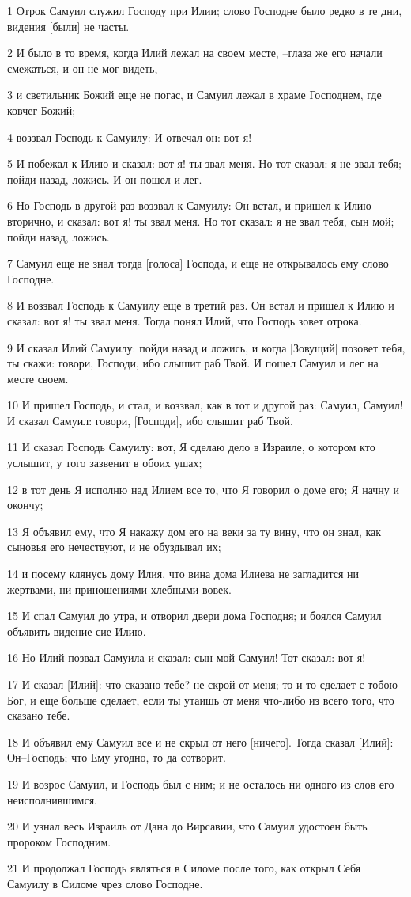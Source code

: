 \par 1 Отрок Самуил служил Господу при Илии; слово Господне было редко в те дни, видения [были] не часты.
\par 2 И было в то время, когда Илий лежал на своем месте, --глаза же его начали смежаться, и он не мог видеть, --
\par 3 и светильник Божий еще не погас, и Самуил лежал в храме Господнем, где ковчег Божий;
\par 4 воззвал Господь к Самуилу: И отвечал он: вот я!
\par 5 И побежал к Илию и сказал: вот я! ты звал меня. Но тот сказал: я не звал тебя; пойди назад, ложись. И он пошел и лег.
\par 6 Но Господь в другой раз воззвал к Самуилу: Он встал, и пришел к Илию вторично, и сказал: вот я! ты звал меня. Но тот сказал: я не звал тебя, сын мой; пойди назад, ложись.
\par 7 Самуил еще не знал тогда [голоса] Господа, и еще не открывалось ему слово Господне.
\par 8 И воззвал Господь к Самуилу еще в третий раз. Он встал и пришел к Илию и сказал: вот я! ты звал меня. Тогда понял Илий, что Господь зовет отрока.
\par 9 И сказал Илий Самуилу: пойди назад и ложись, и когда [Зовущий] позовет тебя, ты скажи: говори, Господи, ибо слышит раб Твой. И пошел Самуил и лег на месте своем.
\par 10 И пришел Господь, и стал, и воззвал, как в тот и другой раз: Самуил, Самуил! И сказал Самуил: говори, [Господи], ибо слышит раб Твой.
\par 11 И сказал Господь Самуилу: вот, Я сделаю дело в Израиле, о котором кто услышит, у того зазвенит в обоих ушах;
\par 12 в тот день Я исполню над Илием все то, что Я говорил о доме его; Я начну и окончу;
\par 13 Я объявил ему, что Я накажу дом его на веки за ту вину, что он знал, как сыновья его нечествуют, и не обуздывал их;
\par 14 и посему клянусь дому Илия, что вина дома Илиева не загладится ни жертвами, ни приношениями хлебными вовек.
\par 15 И спал Самуил до утра, и отворил двери дома Господня; и боялся Самуил объявить видение сие Илию.
\par 16 Но Илий позвал Самуила и сказал: сын мой Самуил! Тот сказал: вот я!
\par 17 И сказал [Илий]: что сказано тебе? не скрой от меня; то и то сделает с тобою Бог, и еще больше сделает, если ты утаишь от меня что-либо из всего того, что сказано тебе.
\par 18 И объявил ему Самуил все и не скрыл от него [ничего]. Тогда сказал [Илий]: Он--Господь; что Ему угодно, то да сотворит.
\par 19 И возрос Самуил, и Господь был с ним; и не осталось ни одного из слов его неисполнившимся.
\par 20 И узнал весь Израиль от Дана до Вирсавии, что Самуил удостоен быть пророком Господним.
\par 21 И продолжал Господь являться в Силоме после того, как открыл Себя Самуилу в Силоме чрез слово Господне.


